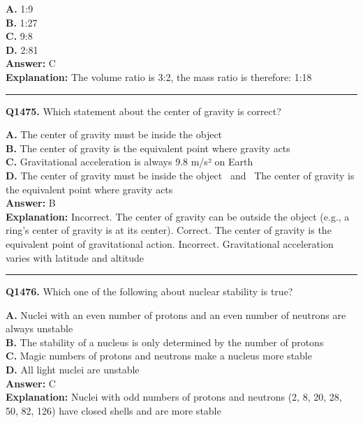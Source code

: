 \documentclass[12pt]{article}
\begin{document}
\textbf{A.} 1:9 \\
\textbf{B.} 1:27 \\
\textbf{C.} 9:8 \\
\textbf{D.} 2:81 \\

\textbf{Answer:} C \\
\textbf{Explanation:} The volume ratio is 3:2, the mass ratio is therefore: 1:18

\hrule
\vspace{1em}


\noindent
\textbf{Q1475.} Which statement about the center of gravity is correct?



\textbf{A.} The center of gravity must be inside the object \\
\textbf{B.} The center of gravity is the equivalent point where gravity acts \\
\textbf{C.} Gravitational acceleration is always 9.8 m/s² on Earth \\
\textbf{D.} The center of gravity must be inside the object  and  The center of gravity is the equivalent point where gravity acts \\

\textbf{Answer:} B \\
\textbf{Explanation:} Incorrect. The center of gravity can be outside the object (e.g., a ring’s center of gravity is at its center).
Correct. The center of gravity is the equivalent point of gravitational action.
Incorrect. Gravitational acceleration varies with latitude and altitude

\hrule
\vspace{1em}


\noindent
\textbf{Q1476.} Which one of the following about nuclear stability is true?



\textbf{A.} Nuclei with an even number of protons and an even number of neutrons are always unstable \\
\textbf{B.} The stability of a nucleus is only determined by the number of protons \\
\textbf{C.} Magic numbers of protons and neutrons make a nucleus more stable \\
\textbf{D.} All light nuclei are unstable \\

\textbf{Answer:} C \\
\textbf{Explanation:} Nuclei with
odd
numbers of protons and neutrons (2, 8, 20, 28, 50, 82, 126) have closed shells and are more stable
\end{document}
